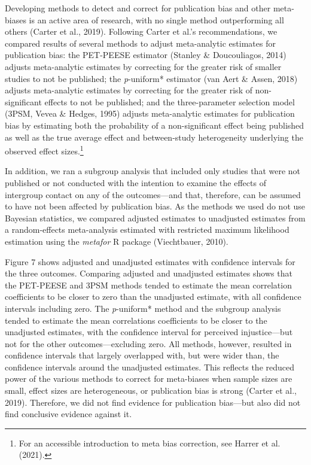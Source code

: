 \documentclass[12pt, letterpaper]{article}
\begin{document}
Developing methods to detect and correct for publication bias and other
meta-biases is an active area of research, with no single method
outperforming all others (Carter et al., 2019). Following Carter et
al.'s recommendations, we compared results of several methods to adjust
meta-analytic estimates for publication bias: the PET-PEESE estimator
(Stanley \& Doucouliagos, 2014) adjusts meta-analytic estimates by
correcting for the greater risk of smaller studies to not be published;
the \emph{p}-uniform* estimator (van Aert \& Assen, 2018) adjusts
meta-analytic estimates by correcting for the greater risk of
non-significant effects to not be published; and the three-parameter
selection model (3PSM, Vevea \& Hedges, 1995) adjusts meta-analytic
estimates for publication bias by estimating both the probability of a
non-significant effect being published as well as the true average
effect and between-study heterogeneity underlying the observed effect
sizes.\footnote{For an accessible introduction to meta bias correction,
  see Harrer et al. (2021).}

In addition, we ran a subgroup analysis that included only studies that
were not published or not conducted with the intention to examine the
effects of intergroup contact on any of the outcomes---and that,
therefore, can be assumed to have not been affected by publication bias.
As the methods we used do not use Bayesian statistics, we compared
adjusted estimates to unadjusted estimates from a random-effects
meta-analysis estimated with restricted maximum likelihood estimation
using the \emph{metafor} R package (Viechtbauer, 2010).

Figure 7 shows adjusted and unadjusted estimates with confidence
intervals for the three outcomes. Comparing adjusted and unadjusted
estimates shows that the PET-PEESE and 3PSM methods tended to estimate
the mean correlation coefficients to be closer to zero than the
unadjusted estimate, with all confidence intervals including zero. The
\emph{p}-uniform* method and the subgroup analysis tended to estimate
the mean correlations coefficients to be closer to the unadjusted
estimates, with the confidence interval for perceived injustice---but
not for the other outcomes---excluding zero. All methods, however,
resulted in confidence intervals that largely overlapped with, but were
wider than, the confidence intervals around the unadjusted estimates.
This reflects the reduced power of the various methods to correct for
meta-biases when sample sizes are small, effect sizes are heterogeneous,
or publication bias is strong (Carter et al., 2019). Therefore, we did
not find evidence for publication bias---but also did not find
conclusive evidence against it.
\end{document}
